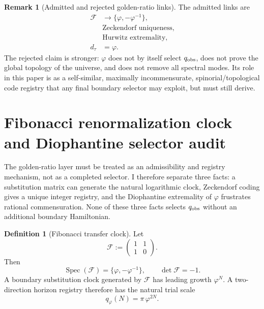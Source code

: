 \documentclass[aps,prd,reprint,nofootinbib,superscriptaddress,floatfix]{revtex4-2}
\numberwithin{equation}{section}
\theoremstyle{definition}
\newtheorem{definition}{Definition}[section]
\newtheorem{remark}{Remark}[section]
\theoremstyle{plain}
\begin{document}
\begin{remark}[Admitted and rejected golden-ratio links]
The admitted links are
\begin{align}
\mathcal F&\to\{\varphi,-\varphi^{-1}\},\\
&\text{Zeckendorf uniqueness},\\
&\text{Hurwitz extremality},\\
d_\tau&=\varphi .
\end{align}
The rejected claim is stronger: \(\varphi\) does not by itself select
\(q_{\rm obs}\), does not prove the global topology of the universe, and
does not remove all spectral modes.  Its role in this paper is as a
self-similar, maximally incommensurate, spinorial/topological code
registry that any final boundary selector may exploit, but must still
derive.
\end{remark}




\section{Fibonacci renormalization clock and Diophantine selector audit}

The golden-ratio layer must be treated as an admissibility and registry
mechanism, not as a completed selector.  I therefore separate three facts:
a substitution matrix can generate the natural logarithmic clock, Zeckendorf
coding gives a unique integer registry, and the Diophantine extremality of
\(\varphi\) frustrates rational commensuration.  None of these three facts
selects \(q_{\rm obs}\) without an additional boundary Hamiltonian.

\begin{definition}[Fibonacci transfer clock]
Let
\begin{equation}
{\mathcal F}:=
\begin{pmatrix}1&1\\1&0\end{pmatrix}.
\end{equation}
Then
\begin{equation}
\operatorname{Spec}({\mathcal F})=\{\varphi,-\varphi^{-1}\},
\qquad
\det{\mathcal F}=-1.
\end{equation}
A boundary substitution clock generated by \({\mathcal F}\) has leading
growth \(\varphi^N\).  A two-direction horizon registry therefore has the
natural trial scale
\begin{equation}
q_\varphi(N)=\pi\,\varphi^{2N}.
\end{equation}
\end{definition}
\end{document}
